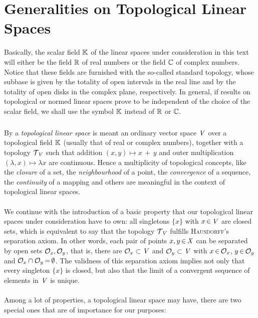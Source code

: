 \documentclass[11pt,twoside]{article}
\begin{document}
\section{Generalities on Topological Linear Spaces}
Basically,
the scalar field ${\mathbb{K}}$ of the linear spaces under consideration in this text
will either be the field ${\mathbb{R}}$ of real numbers
or the field ${\mathbb{C}}$ of complex numbers.
Notice that these fields are furnished
with the so-called {standard topology},
whose subbase is given by the totality of open intervals in the real line
and by the totality of open disks in the complex plane,
respectively.
In general,
if results on topological or normed linear spaces
prove to be independent of the choice of the scalar field,
we shall use the symbol ${\mathbb{K}}$ instead of ${\mathbb{R}}$ or ${\mathbb{C}}$. 

\subparagraph{} %
By a \textit{topological linear space} is meant an ordinary vector space $\mathit{V}$
over a topological field ${\mathbb{K}}$ (usually that of real or complex numbers),
together with a topology $\mathcal{T}_{\,\mathit{V}}$ 
such that addition $(x,y) \mapsto x\,{+}\,y$
and outer multiplication $(\lambda,x) \mapsto \lambda x$ are continuous.
Hence a multiplicity of topological concepts,
like
the \textit{closure} of a set,
the \textit{neighbourhood} of a point,
the \textit{convergence} of a sequence,
the \textit{continuity} of a mapping and others
are meaningful in the context of topological linear spaces.

\paragraph{} %
We continue with the introduction of a basic property
that our topological linear spaces under consideration have to own:
all singletons $\{x\}$ with $x {\,\in\,} \mathit{V}$ are closed sets,
which is equivalent to say
that the topology $\mathcal{T}_{\,\mathit{V}}$
fulfills \textsc{Hausdorff}'s separation axiom.
In other words,
each pair of points $x,y {\,\in\,} \mathit{X}$ can be separated
by open sets $\mathcal{O}_x, \mathcal{O}_y$,
that is,
there are $\mathcal{O}_x \subset \mathit{V}$ and $\mathcal{O}_y \subset \mathit{V}$ with
$x {\,\in\,} \mathcal{O}_x$,
$y {\,\in\,} \mathcal{O}_y$ and
$\mathcal{O}_x \cap \mathcal{O}_y {\,=\,} \emptyset$.
The validness of this separation axiom implies not only
that every singleton $\{x\}$ is closed,
but also
that the limit of a convergent sequence of elements in $\mathit{V}$ is unique.

\paragraph{} %
Among a lot of properties,
a topological linear space may have,
there are two special ones
that are of importance for our purposes:
\end{document}
